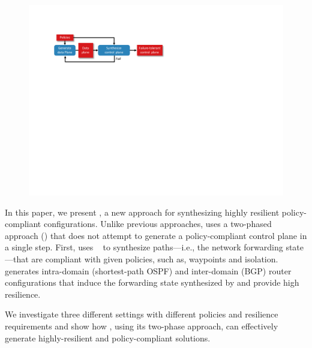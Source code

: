 \begin{figure}
	\includegraphics[width=\linewidth]{figures/architecture.pdf}
	\label{fig:architecture}
\end{figure}

In this paper, we present \name, a new approach for synthesizing
highly resilient policy-compliant configurations.
Unlike previous approaches, \name uses a two-phased approach 
() 
that does not attempt to generate 
a policy-compliant control plane in a single step.
First, \name 
uses \genesis~\cite{genesis}
to synthesize paths---i.e., the network forwarding state---that are compliant
with given policies, such as, waypoints and isolation.
\name generates 
intra-domain (shortest-path OSPF) and inter-domain (BGP) router configurations
that induce the forwarding
state synthesized by \genesis and provide high resilience. 

We investigate three different settings with different policies and
resilience requirements and show how \name, using its two-phase
approach, can effectively generate highly-resilient and
policy-compliant solutions.

